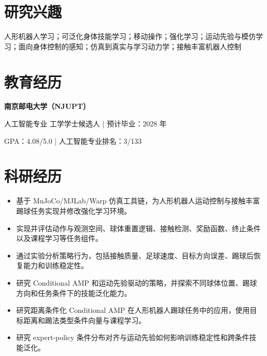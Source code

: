\documentclass[10pt]{article}
\begin{document}

\section{研究兴趣}\color{black}
人形机器人学习；可泛化身体技能学习；移动操作；强化学习；运动先验与模仿学习；面向身体控制的感知；仿真到真实与学习动力学；接触丰富机器人控制

\section{教育经历}\color{black}
{\sffamily\color{cvnavy}\bfseries 南京邮电大学（NJUPT）}\par
\vspace{1pt}人工智能专业 工学学士候选人 \quad | \quad 预计毕业：2028 年\par
\vspace{1pt}GPA：4.08/5.0 \quad | \quad 人工智能专业排名：3/133

\section{科研经历}\color{black}
\begin{itemize}
  \item 基于 MuJoCo/MJLab/Warp 仿真工具链，为人形机器人运动控制与接触丰富踢球任务实现并修改强化学习环境。
  \item 实现并评估动作与观测空间、球体重置逻辑、接触检测、奖励函数、终止条件以及课程学习等任务组件。
  \item 通过实验分析策略行为，包括接触质量、足球速度、目标方向误差、踢球后恢复能力和训练稳定性。
  \item 研究 Conditional AMP 和运动先验驱动的策略，并探索不同球体位置、踢球方向和任务条件下的技能泛化能力。
\end{itemize}

\begin{itemize}
  \item 研究距离条件化 Conditional AMP 在人形机器人踢球任务中的应用，使用目标距离和踢法类型条件向量与课程学习。
  \item 研究 expert-policy 条件分布对齐与运动先验如何影响训练稳定性和跨条件技能泛化。
\end{itemize}
\end{document}
